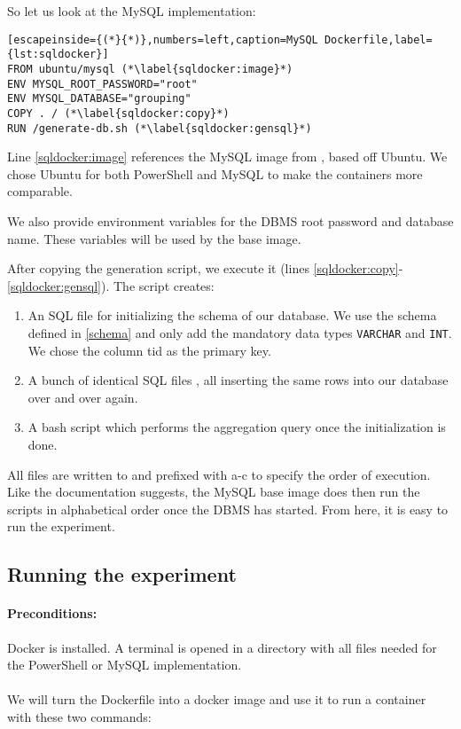 So let us look at the MySQL implementation:

\begin{lstlisting}[escapeinside={(*}{*)},numbers=left,caption=MySQL Dockerfile,label={lst:sqldocker}]
FROM ubuntu/mysql (*\label{sqldocker:image}*)
ENV MYSQL_ROOT_PASSWORD="root"
ENV MYSQL_DATABASE="grouping"
COPY . / (*\label{sqldocker:copy}*)
RUN /generate-db.sh (*\label{sqldocker:gensql}*)
\end{lstlisting}
Line \ref{sqldocker:image} references the MySQL image from \cite{dockerMySQL},
based off Ubuntu. We chose Ubuntu for both PowerShell and MySQL to
make the containers more comparable.

We also provide environment variables for the \gls{DBMS} root password
and database name. These variables will be used by the base image.

After copying the generation script, we execute it
(lines \ref{sqldocker:copy}-\ref{sqldocker:gensql}).
The script creates:
\begin{enumerate}
    \item An SQL file  for initializing the schema of our database.
        We use the schema defined in \ref{schema} and only add
        the mandatory data types \verb+VARCHAR+ and \verb+INT+.
        We chose the column tid as the primary key.
    \item A bunch of identical SQL files ,
        all inserting the same
        rows into our database over and over again.
    \item A bash script  which performs the
        aggregation query once the initialization is done.
\end{enumerate}
All files are written to 
and prefixed with a-c to specify the order of execution.
Like the documentation suggests, the MySQL base image does then
run the scripts in alphabetical order once the \gls{DBMS}
has started. From here, it is easy to run the experiment.

\subsection{Running the experiment}

\paragraph{Preconditions:}
Docker is installed. A terminal is opened in a directory
with all files needed for the PowerShell or MySQL implementation. \\\\
We will turn the Dockerfile into a docker image and use it to
run a container with these two commands:

